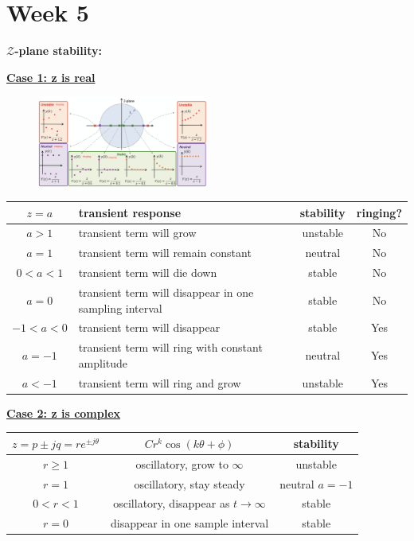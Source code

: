 \section{Week 5}
\textbf{\large $\mathcal{Z}$-plane stability:}
\vspace{0.4cm}


\textbf{\underline{Case 1: z is real}}
\begin{figure}[H]
    \centering
    \includegraphics[width=0.5\textwidth]{images/z_plane_stability.png}
\end{figure}

\begin{table}[h]
\begin{adjustbox}{max width=\textwidth}
\begin{tabular}{|c|p{}|c|c|}
\hline
\textbf{$z=a$} & \textbf{transient response} & \textbf{stability} & \textbf{ringing?} \\\hline
$a> 1$ & transient term will grow & unstable & No \\\hline
$a = 1$ & transient term will remain constant & neutral & No \\\hline
$0<a<1$ & transient term will die down & stable & No \\\hline
$a=0$ & transient term will disappear in one sampling interval & stable & No \\\hline
$-1<a<0$ & transient term will disappear & stable & Yes \\\hline
$a = -1$ & transient term will ring with constant amplitude & neutral & Yes \\\hline
$a < -1$ & transient term will ring and grow & unstable & Yes \\\hline
\end{tabular}
\end{adjustbox}
\end{table}

\textbf{\underline{Case 2: z is complex}}
\begin{table}[h]
\begin{adjustbox}{max width=\textwidth}
\begin{tabular}{|c|c|c|}
\hline
\textbf{$z=p\pm jq = re^{\pm j\theta}$} & \textbf{$Cr^k \cos(k\theta + \phi)$} & \textbf{stability} \\\hline
$r\ge 1$ & oscillatory, grow to $\infty$ & unstable \\\hline
$r=1$ & oscillatory, stay steady & neutral $a=-1$ \\\hline
$0<r<1$ & oscillatory, disappear as $t\to\infty$ & stable  \\\hline
$r=0$ & disappear in one sample interval & stable \\\hline
\end{tabular}
\end{adjustbox}
\end{table}

